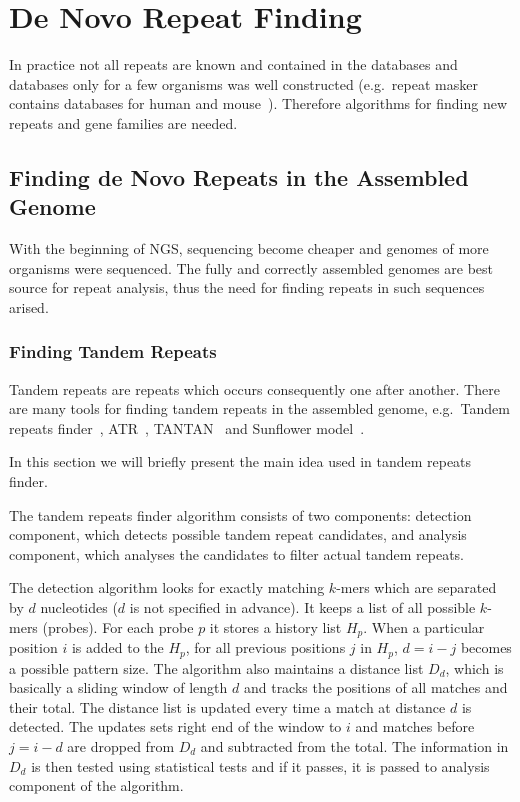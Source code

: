 \section{De Novo Repeat Finding}

In practice not all repeats are known and contained in the databases and databases only for a few organisms was well constructed (e.g.\ repeat masker contains databases for human and mouse~\cite{repeatmasker}). Therefore algorithms for finding new repeats and gene families are needed.

\subsection{Finding de Novo Repeats in the Assembled Genome}

With the beginning of NGS, sequencing become cheaper and genomes of more organisms were sequenced. The fully and correctly assembled genomes are best source for repeat analysis, thus the need for finding repeats in such sequences arised.

\subsubsection{Finding Tandem Repeats}
Tandem repeats are repeats which occurs consequently one after another. There are many tools for finding tandem repeats in the assembled genome, e.g.\ Tandem repeats finder~\cite{trf}, ATR~\cite{atr}, TANTAN~\cite{tantan} and Sunflower model~\cite{nanasi2014probabilistic}.

In this section we will briefly present the main idea used in tandem repeats finder.

The tandem repeats finder algorithm consists of two components: detection component, which detects possible tandem repeat candidates, and analysis component, which analyses the candidates to filter actual tandem repeats.

The detection algorithm looks for exactly matching $k$-mers which are separated by $d$ nucleotides ($d$ is not specified in advance). It keeps a list of all possible $k$-mers (probes).
For each probe $p$ it stores a history list $H_p$.
When a particular position $i$ is added to the $H_p$, for all previous positions $j$ in $H_p$, $d = i - j$ becomes a possible pattern size.
The algorithm also maintains a distance list $D_d$, which is basically a sliding window of length $d$ and tracks the positions of all matches and their total. The distance list is updated every time a match at distance $d$ is detected. The updates sets right end of the window to $i$ and matches before $j = i - d$ are dropped from $D_d$ and subtracted from the total. The information in $D_d$ is then tested using statistical tests and if it passes, it is passed to analysis component of the algorithm.

